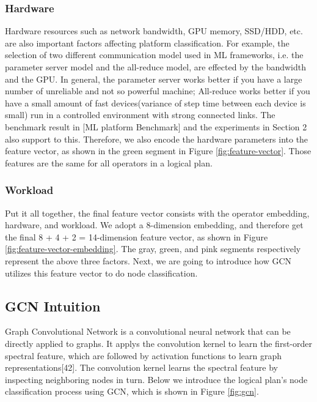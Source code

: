\subsubsection{Hardware}
Hardware resources such as network bandwidth, GPU memory, SSD/HDD, etc. are also important factors affecting platform classification. 
For example, the selection of two different communication model used in ML frameworks, i.e. the parameter server model and the all-reduce model, are effected by the bandwidth and the GPU. 
In general, the parameter server works better if you have a large number of unreliable and not so powerful machine;
All-reduce works better if you have a small amount of fast devices(variance of step time between each device is small) run in a controlled environment with strong connected links. 
The benchmark result in [ML platform Benchmark] and the experiments in Section 2 also support to this. 
Therefore, we also encode the hardware parameters into the feature vector, as shown in the green segment in Figure \ref{fig:feature-vector}. 
Those features are the same for all operators in a logical plan. 


\subsubsection{Workload}



Put it all together, the final feature vector consists with the operator embedding, hardware, and workload.
We adopt a 8-dimension embedding, and therefore get the final 8 + 4 + 2 = 14-dimension feature vector, as shown in Figure \ref{fig:feature-vector-embedding}.
The gray, green, and pink segments respectively represent the above three factors.
Next, we are going to introduce how GCN utilizes this feature vector to do node classification.

\subsection{GCN Intuition}

Graph Convolutional Network is a convolutional neural network that can be directly applied to graphs. 
It applys the convolution kernel to learn the first-order spectral feature, which are followed by activation functions to learn graph representations[42]. 
The convolution kernel learns the spectral feature by inspecting neighboring nodes in turn. 
Below we introduce the logical plan's node classification process using GCN, which is shown in Figure \ref{fig:gcn}.

